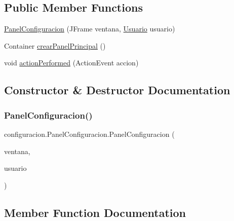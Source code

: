 \subsection*{Public Member Functions}
\begin{DoxyCompactItemize}
\item 
\mbox{\hyperlink{classconfiguracion_1_1_panel_configuracion_a06c88aec1e62f99555b0bdc7c15c357e}{Panel\+Configuracion}} (J\+Frame ventana, \mbox{\hyperlink{classclases_1_1_usuario}{Usuario}} usuario)
\item 
Container \mbox{\hyperlink{classconfiguracion_1_1_panel_configuracion_a9eac30093e153865aad39f852a23ac37}{crear\+Panel\+Principal}} ()
\item 
void \mbox{\hyperlink{classconfiguracion_1_1_panel_configuracion_aab9836cc65c7cf02ca7468f194c85e65}{action\+Performed}} (Action\+Event accion)
\end{DoxyCompactItemize}


\subsection{Constructor \& Destructor Documentation}
\mbox{\label{classconfiguracion_1_1_panel_configuracion_a06c88aec1e62f99555b0bdc7c15c357e}} 
\subsubsection{\texorpdfstring{Panel\+Configuracion()}{PanelConfiguracion()}}
{\footnotesize\ttfamily configuracion.\+Panel\+Configuracion.\+Panel\+Configuracion (\begin{DoxyParamCaption}\item[{J\+Frame}]{ventana,  }\item[{\mbox{\hyperlink{classclases_1_1_usuario}{Usuario}}}]{usuario }\end{DoxyParamCaption})}



\subsection{Member Function Documentation}
\mbox{\label{classconfiguracion_1_1_panel_configuracion_aab9836cc65c7cf02ca7468f194c85e65}} 
